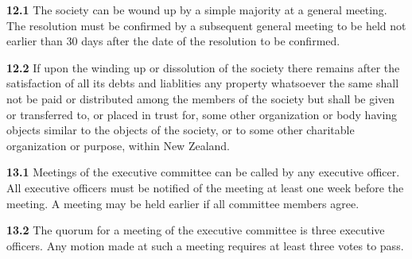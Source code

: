 \vspace{1em}

\textbf{12.1} The society can be wound up by a simple majority at a general meeting. The resolution must be confirmed by a subsequent general meeting to be held not earlier than 30 days after the date of the resolution to be confirmed.

\textbf{12.2} If upon the winding up or dissolution of the society there remains after the satisfaction of all its debts and liablities any property whatsoever the same shall not be paid or distributed among the members of the society but shall be given or transferred to, or placed in trust for, some other organization or body having objects similar to the objects of the society, or to some other charitable organization or purpose, within New Zealand.

\vspace{1em}

\textbf{13.1} Meetings of the executive committee can be called by any executive officer. All executive officers must be notified of the meeting at least one week before the meeting. A meeting may be held earlier if all committee members agree.

\textbf{13.2} The quorum for a meeting of the executive committee is three executive officers. Any motion made at such a meeting requires at least three votes to pass.
